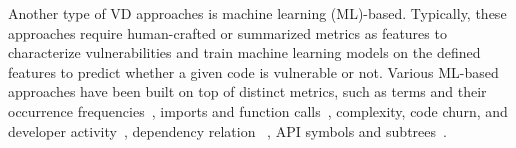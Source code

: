 Another type of VD approaches is machine learning (ML)-based.
Typically, these approaches require human-crafted or summarized
metrics as features to characterize vulnerabilities and train machine
learning models on the defined features to predict whether a given
code is vulnerable or not.
Various ML-based approaches have been built on top of distinct metrics, such as terms and their occurrence frequencies~\cite{scandariato2014predicting}, imports and function calls~\cite{neuhaus2007predicting}, complexity, code churn, and developer activity~\cite{shin2010evaluating}, dependency relation ~\cite{neuhaus2009beauty}, API symbols and subtrees~\cite{yamaguchi2012generalized, yamaguchi2011vulnerability}.


